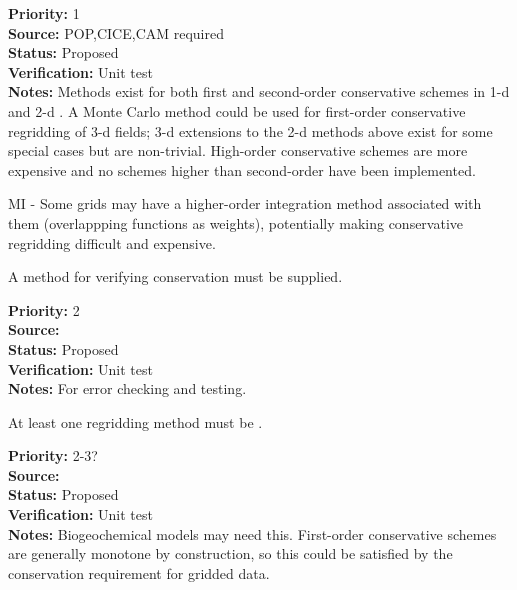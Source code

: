 \begin{reqlist}
{\bf Priority:} 1 \\
{\bf Source:} POP,CICE,CAM required \\
{\bf Status:} Proposed \\
{\bf Verification:} Unit test \\
{\bf Notes:} Methods exist for both first and second-order
             conservative schemes in 1-d and 2-d \cite{Jones1999}.
             A Monte Carlo method could be used for first-order conservative
             regridding of 3-d fields; 3-d extensions to the 2-d methods above
             exist for some special cases but are non-trivial.  
             High-order conservative schemes are more expensive and
             no schemes higher than second-order have been implemented.

             MI - Some grids may have a higher-order integration method
             associated with them (overlappping functions as weights),
             potentially making conservative regridding difficult and expensive.
\end{reqlist}


A method for verifying conservation must be supplied.

\begin{reqlist}
{\bf Priority:} 2 \\
{\bf Source:} \\
{\bf Status:} Proposed \\
{\bf Verification:} Unit test \\
{\bf Notes:} For error checking and testing.
\end{reqlist}


At least one regridding method must be .

\begin{reqlist}
{\bf Priority:} 2-3? \\
{\bf Source:}  \\
{\bf Status:} Proposed \\
{\bf Verification:} Unit test \\
{\bf Notes:} Biogeochemical models may need this.  First-order
             conservative schemes are generally monotone by
             construction, so this could be satisfied by the
             conservation requirement for gridded data.
\end{reqlist}


